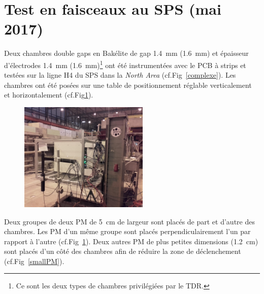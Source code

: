 \section{Test en faisceaux au SPS (mai 2017)}
\vspace{-0.4cm}
Deux chambres double gaps en Bakélite de gap \SI{1.4}{\milli\meter} (\SI{1.6}{\milli\meter}) et épaisseur d'électrodes \SI{1.4}{\milli\meter} (\SI{1.6}{\milli\meter})\footnote{Ce sont les deux types de chambres privilégiées par le TDR.} ont été instrumentées avec le PCB à strips et testées sur la ligne H4 du SPS dans la \textit{North Area} (cf.Fig~\ref{complexe}). Les chambres ont été posées sur une table de positionnement réglable verticalement et horizontalement (cf.Fig\ref{setup2017}).
\begin{figure}[ht!]
	\centering
	\includegraphics[width=0.55\textwidth]{ELE/setup2017.jpg}
	\label{setup2017}
\end{figure}

Deux groupes de deux PM de \SI{5}{\centi\meter} de largeur sont placés de part et d'autre des chambres. Les PM d'un même groupe sont placés perpendiculairement l'un par rapport à l'autre (cf.Fig~\ref{setup2017}). Deux autres PM de plus petites dimensions (\SI{1.2}{\centi\meter}) sont placés d'un côté des chambres afin de réduire la zone de déclenchement (cf.Fig~\ref{smallPM}).  

